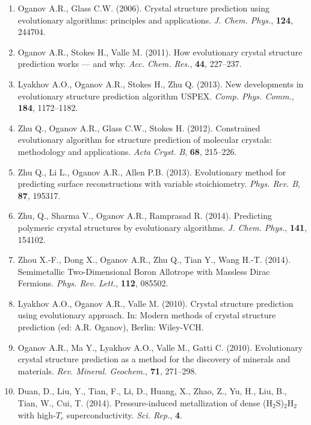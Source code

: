 \documentclass[12pt]{article}
\begin{document}
\begin{enumerate}

\item Oganov A.R., Glass C.W. (2006). Crystal structure prediction using
evolutionary algorithms: principles and applications. \emph{J. Chem. Phys.},
\textbf{124}, 244704.

\item Oganov A.R., Stokes H., Valle M. (2011). How evolutionary crystal
structure prediction works --- and why. \emph{Acc. Chem. Res.}, \textbf{44},
227--237.

\item Lyakhov A.O., Oganov A.R., Stokes H., Zhu Q. (2013). New developments in
evolutionary structure prediction algorithm USPEX. \emph{Comp. Phys. Comm.},
\textbf{184}, 1172--1182.

\item Zhu Q., Oganov A.R., Glass C.W., Stokes H. (2012). Constrained
evolutionary algorithm for structure prediction of molecular crystals:
methodology and applications. \emph{Acta Cryst. B}, \textbf{68}, 215--226.

\item Zhu Q., Li L., Oganov A.R., Allen P.B. (2013). Evolutionary method for
predicting surface reconstructions with variable stoichiometry. \emph{Phys. Rev.
B}, \textbf{87}, 195317.

\item Zhu, Q., Sharma V., Oganov A.R., Ramprasad R. (2014). Predicting polymeric
crystal structures by evolutionary algorithms. \emph{J. Chem. Phys.},
\textbf{141}, 154102.

\item Zhou X.-F., Dong X., Oganov A.R., Zhu Q., Tian Y., Wang H.-T. (2014).
Semimetallic Two-Dimensional Boron Allotrope with Massless Dirac Fermions.
\emph{Phys. Rev. Lett.}, \textbf{112}, 085502.

\item Lyakhov A.O., Oganov A.R., Valle M. (2010). Crystal structure prediction
using evolutionary approach. In: Modern methods of crystal structure prediction
(ed: A.R. Oganov), Berlin: Wiley-VCH.

\item Oganov A.R., Ma Y., Lyakhov A.O., Valle M., Gatti C. (2010). Evolutionary
crystal structure prediction as a method for the discovery of minerals and
materials. \emph{Rev. Mineral. Geochem.}, \textbf{71}, 271--298.

\item Duan, D., Liu, Y., Tian, F., Li, D., Huang, X., Zhao, Z., Yu, H., Liu, B.,
Tian, W., Cui, T. (2014). Pressure-induced metallization of dense
(H$_2$S)$_2$H$_2$ with high-$T_c$ superconductivity. \emph{Sci. Rep.},
\textbf{4}.
 
\end{enumerate}
\end{document}
